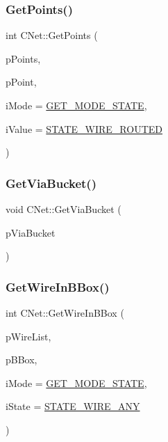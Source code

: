 \mbox{\label{classCNet_a72e98de5efdbafd034130d0711de4951}} 
\subsubsection{\texorpdfstring{GetPoints()}{GetPoints()}}
{\footnotesize\ttfamily int C\+Net\+::\+Get\+Points (\begin{DoxyParamCaption}\item[{vector$<$ \mbox{\hyperlink{classCPoint}{C\+Point}} $\ast$ $>$ $\ast$}]{p\+Points,  }\item[{\mbox{\hyperlink{classCPoint}{C\+Point}} $\ast$}]{p\+Point,  }\item[{int}]{i\+Mode = {\ttfamily \mbox{\hyperlink{BoxRouter_8h_a6f72f2cc9dd31793dd832ccfb2547de4}{G\+E\+T\+\_\+\+M\+O\+D\+E\+\_\+\+S\+T\+A\+TE}}},  }\item[{int}]{i\+Value = {\ttfamily \mbox{\hyperlink{BoxRouter_8h_a4bee041256f62f94c8f451efa0aaabf9}{S\+T\+A\+T\+E\+\_\+\+W\+I\+R\+E\+\_\+\+R\+O\+U\+T\+ED}}} }\end{DoxyParamCaption})}

\mbox{\label{classCNet_aa8ae0a7361da9afc30dab5b36a9a6c7d}} 
\subsubsection{\texorpdfstring{GetViaBucket()}{GetViaBucket()}}
{\footnotesize\ttfamily void C\+Net\+::\+Get\+Via\+Bucket (\begin{DoxyParamCaption}\item[{multimap$<$ \mbox{\hyperlink{res2dmp_8cpp_a8ae9d53f33f46cfcfcb9736e6351452a}{K\+EY}}, int $>$ $\ast$}]{p\+Via\+Bucket }\end{DoxyParamCaption})}

\mbox{\label{classCNet_a885207dedf1b08d52638bda17ba12227}} 
\subsubsection{\texorpdfstring{GetWireInBBox()}{GetWireInBBox()}}
{\footnotesize\ttfamily int C\+Net\+::\+Get\+Wire\+In\+B\+Box (\begin{DoxyParamCaption}\item[{vector$<$ \mbox{\hyperlink{classCWire}{C\+Wire}} $\ast$ $>$ $\ast$}]{p\+Wire\+List,  }\item[{\mbox{\hyperlink{classCBBox}{C\+B\+Box}} $\ast$}]{p\+B\+Box,  }\item[{int}]{i\+Mode = {\ttfamily \mbox{\hyperlink{BoxRouter_8h_a6f72f2cc9dd31793dd832ccfb2547de4}{G\+E\+T\+\_\+\+M\+O\+D\+E\+\_\+\+S\+T\+A\+TE}}},  }\item[{int}]{i\+State = {\ttfamily \mbox{\hyperlink{BoxRouter_8h_a1b285251edd87e1423189470586cc719}{S\+T\+A\+T\+E\+\_\+\+W\+I\+R\+E\+\_\+\+A\+NY}}} }\end{DoxyParamCaption})}

